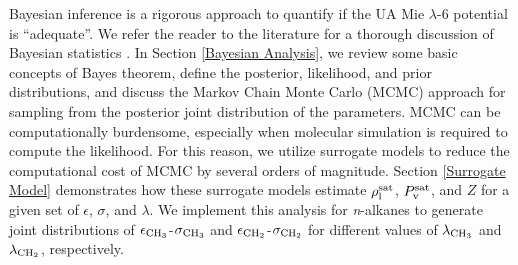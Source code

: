 \documentclass[preprint,letterpaper,floatfix,citeautoscript,aip,jcp]{revtex4-1}
\begin{document}
Bayesian inference is a rigorous approach to quantify if the UA Mie $\lambda$-6 potential is ``adequate''. 
We refer the reader to the literature for a thorough discussion of Bayesian statistics \cite{Bay_Deriv,Bay_MD,Bay_UQ,Wu2016,Kulakova2017}. In Section \ref{Bayesian Analysis}, we review some basic concepts of Bayes theorem, define the posterior, likelihood, and prior distributions, and discuss the Markov Chain Monte Carlo (MCMC) approach
for sampling from the posterior joint distribution of the parameters.
MCMC can be computationally burdensome, especially when molecular simulation is required to compute the likelihood. For this reason, we utilize surrogate models to reduce the computational cost of MCMC by several orders of magnitude. Section \ref{Surrogate Model} demonstrates how these surrogate models estimate $\rho_{\rm l}^{\rm sat}$, $P_{\rm v}^{\rm sat}$, and $Z$ for a given set of $\epsilon$, $\sigma$, and $\lambda$.
We implement this analysis for \textit{n}-alkanes to generate joint distributions of $\epsilon_{\rm CH_3}$-$\sigma_{\rm CH_3}$ and $\epsilon_{\rm CH_2}$-$\sigma_{\rm CH_2}$ for different values of $\lambda_{\rm CH_3}$ and $\lambda_{\rm CH_2}$, respectively.
\end{document}
